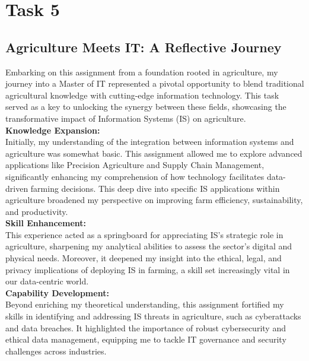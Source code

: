 \documentclass[12pt,a4paper]{article}
\begin{document}
\pagebreak

\setcounter{page}{7}
\section{Task 5}
\subsection{Agriculture Meets IT: A Reflective Journey}
\label{sec:Task 5}

\noindent Embarking on this assignment from a foundation rooted in agriculture, my journey into a Master of IT represented a pivotal opportunity to blend traditional agricultural knowledge with cutting-edge information technology. This task served as a key to unlocking the synergy between these fields, showcasing the transformative impact of Information Systems (IS) on agriculture.\\

\noindent \textbf{Knowledge Expansion:} \\Initially, my understanding of the integration between information systems and agriculture was somewhat basic. This assignment allowed me to explore advanced applications like Precision Agriculture and Supply Chain Management, significantly enhancing my comprehension of how technology facilitates data-driven farming decisions. This deep dive into specific IS applications within agriculture broadened my perspective on improving farm efficiency, sustainability, and productivity.\\

\noindent \textbf{Skill Enhancement:} \\This experience acted as a springboard for appreciating IS's strategic role in agriculture, sharpening my analytical abilities to assess the sector's digital and physical needs. Moreover, it deepened my insight into the ethical, legal, and privacy implications of deploying IS in farming, a skill set increasingly vital in our data-centric world.\\

\noindent \textbf{Capability Development:} \\Beyond enriching my theoretical understanding, this assignment fortified my skills in identifying and addressing IS threats in agriculture, such as cyberattacks and data breaches. It highlighted the importance of robust cybersecurity and ethical data management, equipping me to tackle IT governance and security challenges across industries.\\
\end{document}
